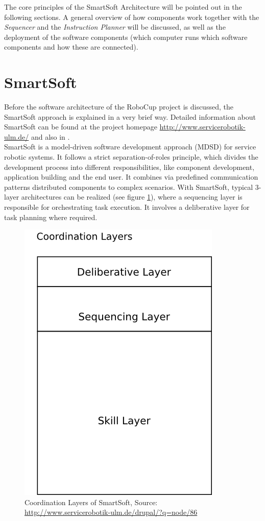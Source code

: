 The core principles of the SmartSoft Architecture will be pointed out in the following
sections. A general overview of how components work together with the \textit{Sequencer} and the \textit{Instruction Planner} will be discussed,
as well as the deployment of the software components (which computer runs which software components and how these are connected).

\section{SmartSoft}
Before the software architecture of the RoboCup project is discussed, the SmartSoft approach is explained in a very brief way. Detailed information about SmartSoft can be found at the project homepage \url{http://www.servicerobotik-ulm.de/} and also in \cite{JOSER}.\\
SmartSoft is a model-driven software development approach (MDSD) for service robotic systems. It follows a strict separation-of-roles principle, which divides the development process into different responsibilities, like component development, application building and the end user. It combines via predefined communication patterns distributed components to complex scenarios.
With SmartSoft, typical 3-layer architectures can be realized (see figure \ref{fig:architecture_smartsoft_layers}), where a sequencing layer is responsible for orchestrating task execution. It involves a deliberative layer for task planning where required.

\begin{figure}[h]
\centering
\includegraphics[scale=1.0]{pic/coordination_layers_smartsoft.png}
\caption{Coordination Layers of SmartSoft, Source: \protect\url{http://www.servicerobotik-ulm.de/drupal/?q=node/86}}
\label{fig:architecture_smartsoft_layers}
\end{figure}

